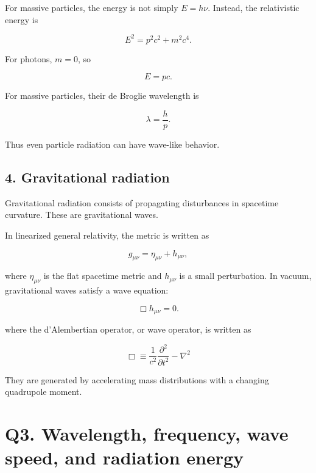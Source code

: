 \documentclass[12pt]{article}
\begin{document}
For massive particles, the energy is not simply $E=h\nu$. Instead, the relativistic energy is

\begin{equation}
E^2=p^2c^2+m^2c^4.
\end{equation}

For photons, $m=0$, so

\begin{equation}
E=pc.
\end{equation}

For massive particles, their de Broglie wavelength is

\begin{equation}
\lambda=\frac{h}{p}.
\end{equation}

Thus even particle radiation can have wave-like behavior.

\subsection*{4. Gravitational radiation}

Gravitational radiation consists of propagating disturbances in spacetime curvature. These are gravitational waves.

In linearized general relativity, the metric is written as

\begin{equation}
g_{\mu\nu}=\eta_{\mu\nu}+h_{\mu\nu},
\end{equation}

where $\eta_{\mu\nu}$ is the flat spacetime metric and $h_{\mu\nu}$ is a small perturbation. In vacuum, gravitational waves satisfy a wave equation:

\begin{equation}
\Box h_{\mu\nu}=0.
\end{equation}

where the d’Alembertian operator, or wave operator, is written as

\begin{equation}
\Box \equiv \frac{1}{c^2}\frac{\partial^2}{\partial t^2} - \nabla^2
\end{equation}


They are generated by accelerating mass distributions with a changing quadrupole moment.

\section*{Q3. Wavelength, frequency, wave speed, and radiation energy}
\end{document}
